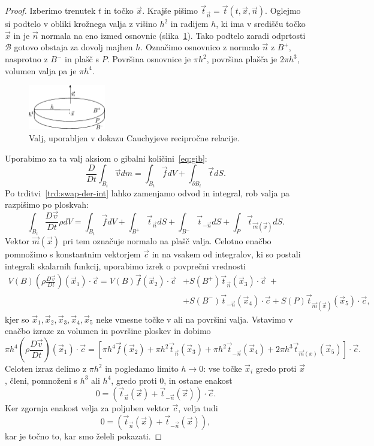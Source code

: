 \documentclass[12pt,a4paper,twoside]{article}
\theoremstyle{definition} %
\theoremstyle{plain} %
\numberwithin{equation}{section}
\newcommand{\B}{\mathcal{B}}
\newcommand{\DD}[2]{\ensuremath{\frac{D #1}{D #2}}}
\newcommand{\DDt}[1]{\DD{#1}{t}}
\newcommand{\vv}{\vec{v}}
\newcommand{\vt}{\vec{t}}
\newcommand{\vc}{\vec{c}}
\newcommand{\vn}{\vec{n}}
\newcommand{\vf}{\vec{f}}
\newcommand{\vm}{\vec{m}}
\newcommand{\vx}{\vec{x}}
\begin{document}
\begin{proof}
Izberimo trenutek $t$ in točko $\vx$. Krajše pišimo $\vt_{\vn} = \vt(t, \vx,
\vn)$. Oglejmo si podtelo v obliki krožnega valja z višino $h^2$ in radijem $h$, ki ima
v središču točko $\vx$ in je $\vn$ normala na eno izmed osnovnic (slika~\ref{fig:valj}).
Tako podtelo zaradi odprtosti $\B$ gotovo obstaja za dovolj majhen $h$. Označimo
osnovnico z normalo $\vn$ z $B^+$, nasprotno z $B^-$ in plašč s $P$. Površina
osnovnice je $\pi h^2$, površina plašča je $2 \pi h^3$, volumen valja pa je
$\pi h^4$.

\begin{figure}[h]
  \centering
  \includegraphics[width=0.3\textwidth]{images/cauchy_disc.pdf}
  \caption{Valj, uporabljen v dokazu Cauchyjeve recipročne relacije.}
  \label{fig:valj}
\end{figure}

Uporabimo za ta
valj aksiom o gibalni količini~\eqref{eq:gib}:
\[  \DDt{} \int_{B_t} \vv dm = \int_{B_t} \vf dV + \int_{\partial B_t} \vt dS. \]
Po trditvi~\ref{trd:swap-der-int} lahko zamenjamo odvod in integral, rob valja pa
razpišimo po ploskvah:
\[
  \int_{B_t} \DDt{\vv} \rho dV = \int_{B_t} \vf dV + \int_{B^+} \vt_{\vn} dS +
  \int_{B^-}\vt_{-\vn} dS + \int_{P} \vt_{\vm(\vx)}dS.
\]
Vektor $\vm(\vx)$ pri tem označuje normalo na plašč valja. Celotno enačbo pomnožimo s konstantnim
vektorjem $\vc$ in na vsakem od integralov, ki so postali integrali skalarnih funkcij, uporabimo izrek
o povprečni vrednosti
\begin{align*}
  V(B) (\rho\DDt{\vv})(\vx_1)\cdot\vc = V(B) \vf(\vx_2)\cdot\vc &+ S(B^+)\vt_{\vn}(\vx_3)\cdot\vc\;+ \\&+
  S(B^-)\vt_{-\vn}(\vx_4)\cdot\vc + S(P)\vt_{\vm(\vx)}(\vx_5)\cdot\vc,
\end{align*}
kjer so $\vx_1, \vx_2, \vx_3, \vx_4, \vx_5$ neke vmesne točke v ali na površini valja.
Vstavimo v enačbo izraze za volumen in površine ploskev in dobimo
\[
  \pi h^4 (\rho \DDt{\vv})(\vx_1)\cdot\vc = \left[\pi h^4 \vf(\vx_2) + \pi h^2 \vt_{\vn}(\vx_3) +
  \pi h^2 \vt_{-\vn}(\vx_4) + 2 \pi h^3 \vt_{\vm(x)}(\vx_5)\right]\cdot\vc.
\]
Celoten izraz delimo z $\pi h^2$ in pogledamo limito $h\to 0$: vse točke $\vx_i$ gredo proti $\vx$,
členi, pomnoženi s $h^3$ ali $h^4$, gredo proti 0, in ostane enakost
\[
  0 = (\vt_{\vn}(\vx) + \vt_{-\vn}(\vx))\cdot\vc.
\]
Ker zgornja enakost velja za poljuben vektor $\vc$, velja tudi
\[
  0 = (\vt_{\vn}(\vx) + \vt_{-\vn}(\vx)),
\]
kar je točno to, kar smo želeli pokazati.
\end{proof}
\end{document}
